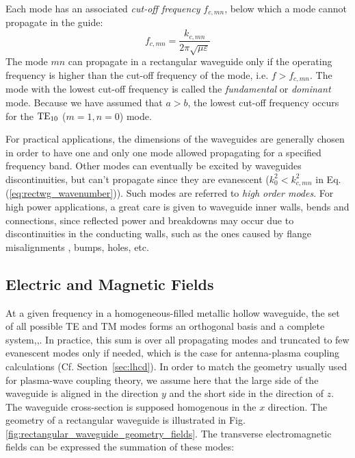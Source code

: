 Each mode has an associated \textit{cut-off frequency} $f_{c,mn}$, below which a mode cannot propagate in the guide:
\begin{equation}
	f_{c,mn} = \frac{k_{c,mn}}{2\pi\sqrt{\mu \varepsilon}}
	\label{eq:rectwg_cutoff-frequency}
\end{equation}
The mode $mn$ can propagate in a rectangular waveguide only if the operating frequency is higher than the cut-off frequency of the mode, i.e. $f>f_{c,mn}$. The mode with the lowest cut-off frequency is called the \textit{fundamental} or \textit{dominant} mode. Because we have assumed that $a>b$, the lowest cut-off frequency occurs for the ${\mathrm{TE}}_{10}$ ($m=1,n=0$) mode. 

For practical applications, the dimensions of the waveguides are generally chosen in order to have one and only one mode allowed propagating for a specified frequency band. Other modes can eventually be excited by waveguides discontinuities, but can’t propagate since they are evanescent ($k^2_0 < k_{c,mn}^2$ in Eq.(\ref{eq:rectwg_wavenumber})). Such modes are referred to \textit{high order modes}. For high power applications, a great care is given to waveguide inner walls, bends and connections, since reflected power and breakdowns may occur due to discontinuities in the conducting walls, such as the ones caused by flange misalignments , bumps, holes, etc.

\subsection{Electric and Magnetic Fields}
At a given frequency in a homogeneous-filled metallic hollow waveguide, the set of all possible TE and TM modes forms an orthogonal basis and a complete system\cite[§1.2]{marcuvitz1951},\cite[§5.2]{Collin1990},\cite[§8.2]{Harrington2001}. In practice, this sum is over all propagating modes and truncated to few evanescent modes only if needed, which is the case for antenna-plasma coupling calculations (Cf. Section~\ref{sec:lhcd}). In order to match the geometry usually used for plasma-wave coupling theory, we assume here that the large side of the waveguide is aligned in the direction $y$ and the short side in the direction of $z$. The waveguide cross-section is supposed homogenous in the $x$ direction. The geometry of a rectangular waveguide is illustrated in Fig.\ref{fig:rectangular_waveguide_geometry_fields}. The transverse electromagnetic fields can be expressed the summation of these modes:

